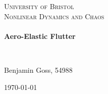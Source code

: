 \begin{titlepage}
\begin{center}


\textsc{\Huge University of Bristol}\\[1.5cm]


\textsc{\Large Nonlinear Dynamics and Chaos}\\[0.5cm]

\HRule \\[0.4cm]
{ \huge \bfseries Aero-Elastic Flutter \\[0.4cm] }

\HRule \\[1.5cm]

\begin{minipage}{0.4\textwidth}
\begin{center} \large
Benjamin Goss, 54988\\
\end{center}
\end{minipage}
\begin{minipage}{0.4\textwidth}
\begin{flushright} \large
\end{flushright}
\end{minipage}
\end{center}

\center
\begin{minipage}{0.9\textwidth}

\end{minipage}

\begin{center}
{\large \today}

\end{center}

\end{titlepage}